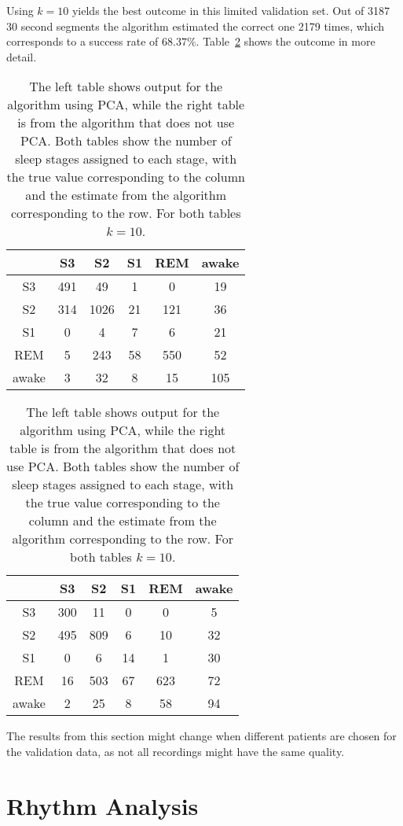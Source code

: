 Using $k=10$ yields the best outcome in this limited validation set. Out of 3187 30 second segments the algorithm estimated the correct one 2179 times, which corresponds to a success rate of $68.37\%$. Table~\ref{tab:error_validation} shows the outcome in more detail.

\begin{table}[h]
	\centering
	\begin{subtable}{0.48\textwidth}
		\begin{tabular}{c|ccccc}
			    & S3  & S2  & S1 & REM & awake \\
			\hline
			S3 & 491  & 49  & 1  & 0  & 19 \\
			S2 & 314  & 1026  & 21  & 121  & 36 \\
			S1 & 0  & 4  & 7  & 6  & 21 \\
			REM & 5  & 243  & 58  & 550  & 52 \\
			awake & 3  & 32  & 8  & 15  & 105 \\
		\end{tabular}
	\end{subtable}
	\hfill
	\begin{subtable}{0.48\textwidth}
		\begin{tabular}{c|ccccc}
			   & S3  & S2  & S1 & REM & awake \\
			\hline
			S3 & 300  & 11  & 0  & 0  & 5 \\
			S2 & 495  & 809  & 6  & 10  & 32 \\
			S1 & 0  & 6  & 14  & 1  & 30 \\
			REM & 16  & 503  & 67  & 623  & 72 \\
			awake & 2  & 25  & 8  & 58  & 94 \\
		\end{tabular}
	\end{subtable}
	
	\caption{The left table shows output for the algorithm using PCA, while the right table is from the algorithm that does not use PCA. Both tables show the number of sleep stages assigned to each stage, with the true value corresponding to the column and the estimate from the algorithm corresponding to the row. For both tables $k=10$.}
	\label{tab:error_validation}
\end{table}

The results from this section might change when different patients are chosen for the validation data, as not all recordings might have the same quality.


\section{Rhythm Analysis}
\label{sec:rhythm_analysis}

